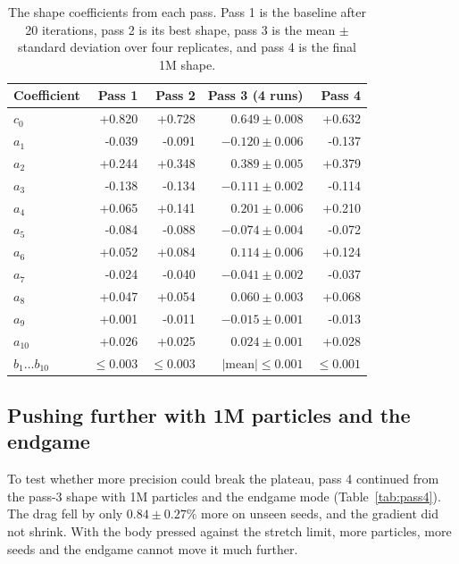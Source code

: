 \documentclass[10pt]{article}
\begin{document}
\begin{table}[H]
\centering
\small
\caption{\label{tab:coeffs}The shape coefficients from each pass. Pass 1 is the baseline after 20 iterations, pass 2 is its best shape, pass 3 is the mean $\pm$ standard deviation over four replicates, and pass 4 is the final 1M shape.}
\begin{tabular}{lrrrr}
\toprule
Coefficient & Pass 1 & Pass 2 & Pass 3 (4 runs) & Pass 4 \\
\midrule
$c_0$ & +0.820 & +0.728 & $0.649 \pm 0.008$ & +0.632 \\
$a_{1}$ & -0.039 & -0.091 & $-0.120 \pm 0.006$ & -0.137 \\
$a_{2}$ & +0.244 & +0.348 & $0.389 \pm 0.005$ & +0.379 \\
$a_{3}$ & -0.138 & -0.134 & $-0.111 \pm 0.002$ & -0.114 \\
$a_{4}$ & +0.065 & +0.141 & $0.201 \pm 0.006$ & +0.210 \\
$a_{5}$ & -0.084 & -0.088 & $-0.074 \pm 0.004$ & -0.072 \\
$a_{6}$ & +0.052 & +0.084 & $0.114 \pm 0.006$ & +0.124 \\
$a_{7}$ & -0.024 & -0.040 & $-0.041 \pm 0.002$ & -0.037 \\
$a_{8}$ & +0.047 & +0.054 & $0.060 \pm 0.003$ & +0.068 \\
$a_{9}$ & +0.001 & -0.011 & $-0.015 \pm 0.001$ & -0.013 \\
$a_{10}$ & +0.026 & +0.025 & $0.024 \pm 0.001$ & +0.028 \\
$b_1\ldots b_{10}$ & $\le 0.003$ & $\le 0.003$ & $|\mathrm{mean}| \le 0.001$ & $\le 0.001$ \\
\bottomrule
\end{tabular}
\par{}
\end{table}


\subsection{Pushing further with 1M particles and the endgame}
To test whether more precision could break the plateau, pass 4 continued from the pass-3 shape with 1M particles and the endgame mode (Table~\ref{tab:pass4}).
The drag fell by only $0.84 \pm 0.27$\% more on unseen seeds, and the gradient did not shrink.
With the body pressed against the stretch limit, more particles, more seeds and the endgame cannot move it much further.
\end{document}
